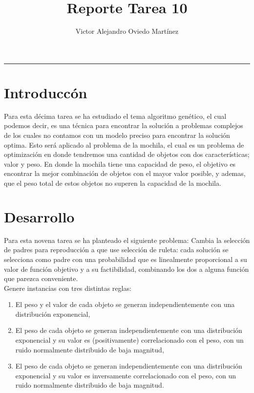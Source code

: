\documentclass{article}
\title{Reporte Tarea 10}
\author{Victor Alejandro Oviedo Martínez}
\begin{document}
\maketitle
\hrule

\section{Introduccón}\label{intro}
Para esta décima tarea \citep{DRA.P10} se ha estudiado el tema algoritmo genético, el cual podemos decir, es una técnica para encontrar la  solución a problemas complejos de los cuales no contamos con un modelo preciso para encontrar la solución optima. Esto será aplicado al problema de la mochila, el cual es un problema de optimización en donde tendremos una cantidad de objetos con dos características; valor y peso. En donde la mochila tiene una capacidad de peso, el objetivo es encontrar la mejor combinación  de objetos con el mayor valor posible, y ademas, que el peso total de estos objetos no superen la capacidad de la mochila.\\ 




\section{Desarrollo}

Para esta novena tarea se ha planteado el siguiente problema: Cambia la selección de padres para reproducción a que use selección de ruleta: cada solución se selecciona como padre con una probabilidad que es linealmente proporcional a su valor de función objetivo y a su factibilidad, combinando los dos a alguna función que parezca conveniente.\\

Genere instancias con tres distintas reglas:


\begin{enumerate}
\item El peso y el valor de cada objeto se generan independientemente con una distribución exponencial,
\item El peso de cada objeto se generan independientemente con una distribución exponencial y su valor es (positivamente) correlacionado con el peso, con un ruido normalmente distribuido de baja magnitud,
\item El peso de cada objeto se generan independientemente con una distribución exponencial y su valor es inversamente correlacionado con el peso, con un ruido normalmente distribuido de baja magnitud.
\end{enumerate}
\end{document}
